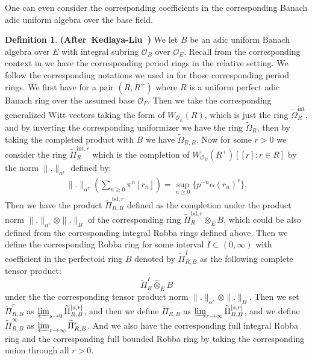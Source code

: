 \documentclass[12pt]{amsart}
\theoremstyle{definition}
\newtheorem{definition}[theorem]{Definition}
\numberwithin{equation}{section}
\begin{document}
\indent One can even consider the corresponding coefficients in the corresponding Banach adic uniform algebra over the base field.




\begin{definition} \mbox{\bf{(After Kedlaya-Liu \cite[Definition 4.1.1]{KL2})}}
We let $B$ be an adic uniform Banach algebra over $E$ with integral subring $\mathcal{O}_B$ over $\mathcal{O}_E$. Recall from the corresponding context in \cite{KL1} we have the corresponding period rings in the relative setting. We follow the corresponding notations we used in \cite[Section 2.1]{T2} for those corresponding period rings. We first have for a pair $(R,R^+)$ where $R$ is a uniform perfect adic Banach ring over the assumed base $\mathcal{O}_F$. Then we take the corresponding generalized Witt vectors taking the form of $W_{\mathcal{O}_E}(R)$, which is just the ring $\widetilde{\Omega}_R^\mathrm{int}$, and by inverting the corresponding uniformizer we have the ring $\widetilde{\Omega}_R$, then by taking the completed product with $B$ we have $\widetilde{\Omega}_{R,B}$. Now for some $r>0$ we consider the ring $\widetilde{\Pi}^{\mathrm{int},r}_{R}$ which is the completion of $W_{\mathcal{O}_E}(R^+)[[r]:r\in R] $ by the norm $\|.\|_{\alpha^r}$ defined by:
\begin{align}
\|.\|_{\alpha^r}(\sum_{n\geq 0}\pi^n[\overline{r}_n])=\sup_{n\geq 0}\{p^{-n}\alpha(\overline{r}_n)^r\}.	
\end{align}
Then we have the product $\widetilde{\Pi}^{\mathrm{bd},r}_{R,B}$ defined as the completion under the product norm $\|.\|_{\alpha^r}\otimes \|.\|_B$ of the corresponding ring $\widetilde{\Pi}^{\mathrm{bd},r}_{R}\otimes_{E }B$, which could be also defined from the corresponding integral Robba rings defined above. Then we define the corresponding Robba ring for some interval $I\subset (0,\infty)$ with coefficient in the perfectoid ring $B$ denoted by $\widetilde{\Pi}^{I}_{R,B}$ as the following complete tensor product:
\begin{displaymath}
\widetilde{\Pi}^{I}_{R}\widehat{\otimes}_{E} B	
\end{displaymath}
under the the corresponding tensor product norm $\|.\|_{\alpha^r}\otimes \|.\|_B$. Then we set $\widetilde{\Pi}^r_{R,B}$ as $\varprojlim_{s\rightarrow 0}\widetilde{\Pi}^{[s,r]}_{R,B}$, and then we define $\widetilde{\Pi}_{R,B}$ as $\varinjlim_{r\rightarrow \infty}\widetilde{\Pi}^{[s,r]}_{R,B}$, and we define $\widetilde{\Pi}^\infty_{R,B}$ as $\varprojlim_{r\rightarrow \infty}\widetilde{\Pi}^{r}_{R,B}$. And we also have the corresponding full integral Robba ring and the corresponding full bounded Robba ring by taking the corresponding union through all $r>0$.
\end{definition}
\end{document}

